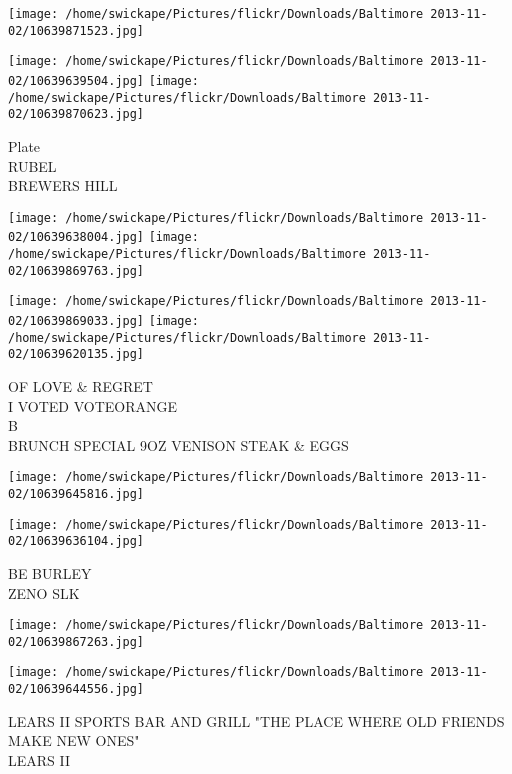 \documentclass[10pt,letterpaper]{article}
\begin{document}
\texttt{[image: /home/swickape/Pictures/flickr/Downloads/Baltimore 2013-11-02/10639871523.jpg]}

\vspace{0.25in}
\texttt{[image: /home/swickape/Pictures/flickr/Downloads/Baltimore 2013-11-02/10639639504.jpg]}
\texttt{[image: /home/swickape/Pictures/flickr/Downloads/Baltimore 2013-11-02/10639870623.jpg]}

Plate\\
RUBEL\\
BREWERS HILL\\
\pagebreak

\texttt{[image: /home/swickape/Pictures/flickr/Downloads/Baltimore 2013-11-02/10639638004.jpg]}
\texttt{[image: /home/swickape/Pictures/flickr/Downloads/Baltimore 2013-11-02/10639869763.jpg]}

\texttt{[image: /home/swickape/Pictures/flickr/Downloads/Baltimore 2013-11-02/10639869033.jpg]}
\texttt{[image: /home/swickape/Pictures/flickr/Downloads/Baltimore 2013-11-02/10639620135.jpg]}

OF LOVE \& REGRET\\
I VOTED VOTEORANGE\\
B\\
BRUNCH SPECIAL 9OZ VENISON STEAK \& EGGS\\
\pagebreak

\texttt{[image: /home/swickape/Pictures/flickr/Downloads/Baltimore 2013-11-02/10639645816.jpg]}

\vspace{0.25in}
\texttt{[image: /home/swickape/Pictures/flickr/Downloads/Baltimore 2013-11-02/10639636104.jpg]}

BE BURLEY\\
ZENO SLK\\
\pagebreak

\texttt{[image: /home/swickape/Pictures/flickr/Downloads/Baltimore 2013-11-02/10639867263.jpg]}

\vspace{0.25in}
\texttt{[image: /home/swickape/Pictures/flickr/Downloads/Baltimore 2013-11-02/10639644556.jpg]}

LEARS II SPORTS BAR AND GRILL "THE PLACE WHERE OLD FRIENDS MAKE NEW ONES"\\
LEARS II\\
\pagebreak
\end{document}
